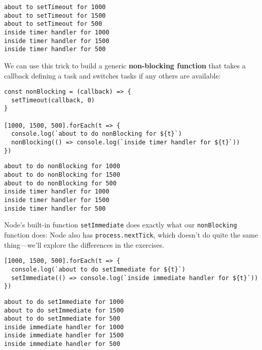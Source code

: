 \documentclass[krantzl]{krantz}
\newcommand{\glossref}[1]{\textbf{#1}}
\begin{document}
\begin{lstlisting}[frame=single,frameround=tttt]
about to setTimeout for 1000
about to setTimeout for 1500
about to setTimeout for 500
inside timer handler for 1000
inside timer handler for 1500
inside timer handler for 500
\end{lstlisting}



\noindent We can use this trick to build a generic
\glossref{non-blocking function}
that takes a callback defining a task
and switches tasks if any others are available:


\begin{lstlisting}[frame=single,frameround=tttt]
const nonBlocking = (callback) => {
  setTimeout(callback, 0)
}

[1000, 1500, 500].forEach(t => {
  console.log(`about to do nonBlocking for ${t}`)
  nonBlocking(() => console.log(`inside timer handler for ${t}`))
})
\end{lstlisting}



\begin{lstlisting}[frame=single,frameround=tttt]
about to do nonBlocking for 1000
about to do nonBlocking for 1500
about to do nonBlocking for 500
inside timer handler for 1000
inside timer handler for 1500
inside timer handler for 500
\end{lstlisting}



Node's built-in function \texttt{setImmediate}
does exactly what our \texttt{nonBlocking} function does:
Node also has \texttt{process.nextTick},
which doesn't do quite the same thing---we'll explore the differences in the exercises.


\begin{lstlisting}[frame=single,frameround=tttt]
[1000, 1500, 500].forEach(t => {
  console.log(`about to do setImmediate for ${t}`)
  setImmediate(() => console.log(`inside immediate handler for ${t}`))
})
\end{lstlisting}



\begin{lstlisting}[frame=single,frameround=tttt]
about to do setImmediate for 1000
about to do setImmediate for 1500
about to do setImmediate for 500
inside immediate handler for 1000
inside immediate handler for 1500
inside immediate handler for 500
\end{lstlisting}
\end{document}
